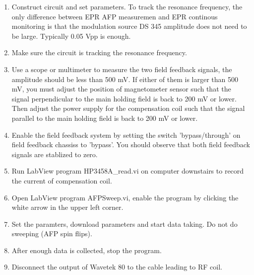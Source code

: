 \begin{enumerate}
\item Construct circuit and set parameters.  To track the resonance frequency,
the only difference between EPR AFP measuremen and EPR continous monitoring is 
that the modulation source DS 345 amplitude does not need to be large.  Typically 
0.05 Vpp is enough.

\item Make sure the circuit is tracking the resonance frequency.

\item Use a scope or multimeter to measure the two field feedback signals, the 
amplitude should be less than 500 mV.  If either of them is larger than 500 mV, 
you must adjust the position of magnetometer sensor such that the signal perpendicular
to the main holding field is back to 200 mV or lower.  Then adjust the
power supply for the compensation coil such that the signal parallel to
the main holding field is back to 200 mV or lower.
 
\item Enable the field feedback system by setting the switch 'bypass/through' 
on field feedback chassiss to 'bypass'.  You should observe that both field 
feedback signals are stablized to zero.

\item Run LabView program HP3458A\_read.vi on computer downstairs to record the current
of compensation coil.

\item Open LabView program AFPSweep.vi, enable the program by clicking the
white arrow in the upper left corner.

\item Set the paramters, download parameters
and start data taking.  Do not do sweeping (AFP spin flips).

\item After enough data is collected, stop the program.

\item Disconnect the output of Wavetek 80 to the cable leading to RF coil.

\end{enumerate}



